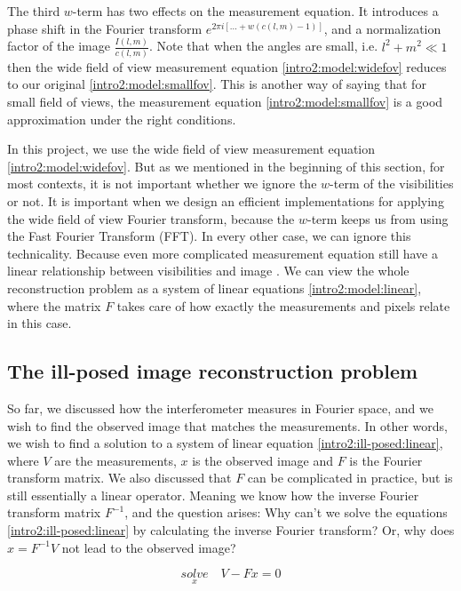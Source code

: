 The third $w$-term has two effects on the measurement equation. It introduces a phase shift in the Fourier transform $e^{2 \pi i [\ldots +w(c(l, m) - 1)]}$, and a normalization factor of the image $\frac{I(l, m)}{c(l, m)}$. Note that when the angles are small, i.e. $l^2 +m^2 \ll 1$ then the wide field of view measurement equation \eqref{intro2:model:widefov} reduces to our original \eqref{intro2:model:smallfov}. This is another way of saying that for small field of views, the measurement equation \eqref{intro2:model:smallfov} is a good approximation under the right conditions. 

In this project, we use the wide field of view measurement equation \eqref{intro2:model:widefov}. But as we mentioned in the beginning of this section, for most contexts, it is not important whether we ignore the $w$-term of the visibilities or not. It is important when we design an efficient implementations for applying the wide field of view Fourier transform, because the $w$-term keeps us from using the Fast Fourier Transform (FFT). In every other case, we can ignore this technicality. Because even more complicated measurement equation still have a linear relationship between visibilities and image \cite{smirnov2011revisiting1, smirnov2011revisiting2, smirnov2011revisiting3, smirnov2011revisiting4}. We can view the whole reconstruction problem as a system of linear equations \eqref{intro2:model:linear}, where the matrix $F$ takes care of how exactly the measurements and pixels relate in this case.

\subsection{The ill-posed image reconstruction problem}\label{intro2:ill-posed}
So far, we discussed how the interferometer measures in Fourier space, and we wish to find the observed image that matches the measurements. In other words, we wish to find a solution to a system of linear equation \eqref{intro2:ill-posed:linear}, where $V$ are the measurements, $x$ is the observed image and $F$ is the Fourier transform matrix. We also discussed that $F$ can be complicated in practice, but is still essentially a linear operator. Meaning we know how the inverse Fourier transform matrix $F^{-1}$, and the question arises: Why can't we solve the equations \eqref{intro2:ill-posed:linear} by calculating the inverse Fourier transform? Or, why does $x = F^{-1} V$ not lead to the observed image?

\begin{equation}\label{intro2:ill-posed:linear}
\underset{x}{solve}\quad V - Fx = 0
\end{equation}

